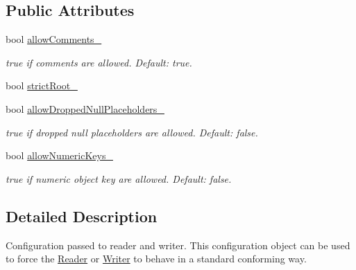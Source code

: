 \subsection*{Public Attributes}
\begin{DoxyCompactItemize}
\item 
bool \hyperlink{class_json_1_1_features_a33afd389719624b6bdb23950b3c346c9}{allow\+Comments\+\_\+}\hypertarget{class_json_1_1_features_a33afd389719624b6bdb23950b3c346c9}{}\label{class_json_1_1_features_a33afd389719624b6bdb23950b3c346c9}

\begin{DoxyCompactList}\small\item\em {\ttfamily true} if comments are allowed. Default\+: {\ttfamily true}. \end{DoxyCompactList}\item 
bool \hyperlink{class_json_1_1_features_a1162c37a1458adc32582b585b552f9c3}{strict\+Root\+\_\+}
\item 
bool \hyperlink{class_json_1_1_features_a5076aa72c05c7596ac339ede36c97a6a}{allow\+Dropped\+Null\+Placeholders\+\_\+}\hypertarget{class_json_1_1_features_a5076aa72c05c7596ac339ede36c97a6a}{}\label{class_json_1_1_features_a5076aa72c05c7596ac339ede36c97a6a}

\begin{DoxyCompactList}\small\item\em {\ttfamily true} if dropped null placeholders are allowed. Default\+: {\ttfamily false}. \end{DoxyCompactList}\item 
bool \hyperlink{class_json_1_1_features_aff3cb16b79d15d3d761b11a0dd6d4d6b}{allow\+Numeric\+Keys\+\_\+}\hypertarget{class_json_1_1_features_aff3cb16b79d15d3d761b11a0dd6d4d6b}{}\label{class_json_1_1_features_aff3cb16b79d15d3d761b11a0dd6d4d6b}

\begin{DoxyCompactList}\small\item\em {\ttfamily true} if numeric object key are allowed. Default\+: {\ttfamily false}. \end{DoxyCompactList}\end{DoxyCompactItemize}


\subsection{Detailed Description}
Configuration passed to reader and writer. This configuration object can be used to force the \hyperlink{class_json_1_1_reader}{Reader} or \hyperlink{class_json_1_1_writer}{Writer} to behave in a standard conforming way. 

